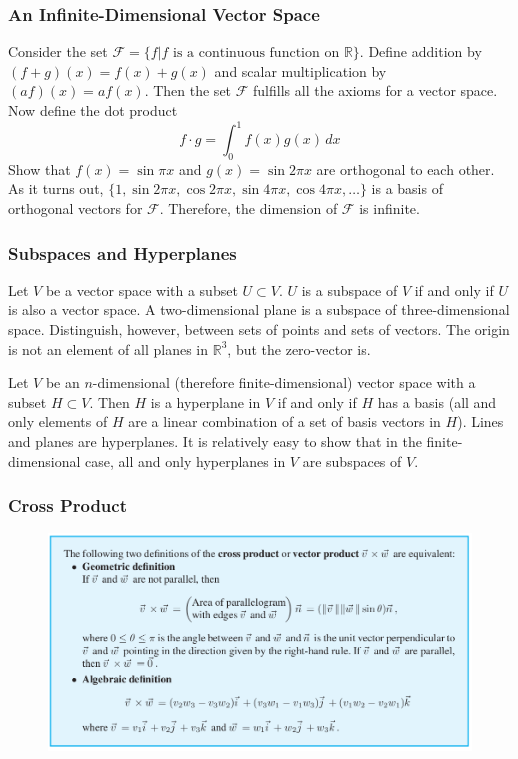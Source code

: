 \documentclass[xcolor=dvipsnames]{beamer}
\begin{document}
\begin{frame}
  \frametitle{An Infinite-Dimensional Vector Space}
  Consider the set $\mathcal{F}=\{f|f\mbox{ is a continuous function
    on }\mathbb{R}\}$. Define addition by $(f+g)(x)=f(x)+g(x)$ and
  scalar multiplication by $(af)(x)=af(x)$. Then the set $\mathcal{F}$
  fulfills all the axioms for a vector space. Now define the dot
  product
  \begin{equation}
    \label{eq:ivaichoh}
    f\cdot{}g=\int_{0}^{1}f(x)g(x)\,dx
  \end{equation}
Show that $f(x)=\sin\pi{}x$ and $g(x)=\sin{}2\pi{}x$ are orthogonal to
each other. As it turns out,
$\{1,\sin{}2\pi{}x,\cos{}2\pi{}x,\sin{}4\pi{}x,\cos{}4\pi{}x,{\ldots}\}$
is a basis of orthogonal vectors for $\mathcal{F}$. Therefore, the
dimension of $\mathcal{F}$ is infinite. 
\end{frame}

\begin{frame}
  \frametitle{Subspaces and Hyperplanes}
  Let $V$ be a vector space with a subset $U\subset{}V$. $U$ is a
  \alert{subspace} of $V$ if and only if $U$ is also a vector space. A
  two-dimensional plane is a subspace of three-dimensional space.
  Distinguish, however, between sets of points and sets of vectors.
  The origin is not an element of all planes in $\mathbb{R}^{3}$, but
  the zero-vector is.

  \medskip

  Let $V$ be an $n$-dimensional (therefore finite-dimensional) vector
  space with a subset $H\subset{}V$. Then $H$ is a \alert{hyperplane}
  in $V$ if and only if $H$ has a basis (all and only elements of $H$
  are a linear combination of a set of basis vectors in $H$). Lines
  and planes are hyperplanes. It is relatively easy to show that in
  the finite-dimensional case, all and only hyperplanes in $V$ are
  subspaces of $V$.
\end{frame}

\begin{frame}
  \frametitle{Cross Product}
  \begin{figure}[h]
    \includegraphics[scale=0.32]{./diagrams/crossproduct.png}
  \end{figure}
\end{frame}
\end{document}
